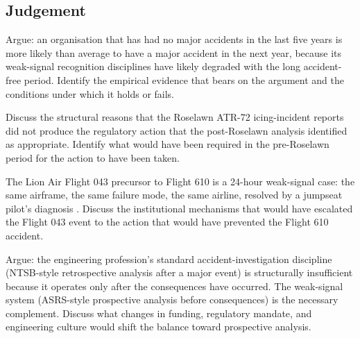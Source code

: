 \subsection*{Judgement}

\begin{exercise}
Argue: an organisation that has had no major accidents in the last five years is more likely than average to have a major accident in the next year, because its weak-signal recognition disciplines have likely degraded with the long accident-free period. Identify the empirical evidence that bears on the argument and the conditions under which it holds or fails.
\end{exercise}

\begin{exercise}
Discuss the structural reasons that the Roselawn ATR-72 icing-incident reports \cite{acc:ntsb-aar96-01} did not produce the regulatory action that the post-Roselawn analysis identified as appropriate. Identify what would have been required in the pre-Roselawn period for the action to have been taken.
\end{exercise}

\begin{exercise}
The Lion Air Flight 043 precursor to Flight 610 is a 24-hour weak-signal case: the same airframe, the same failure mode, the same airline, resolved by a jumpseat pilot's diagnosis \cite{acc:knkt-lion-air-610-2019,acc:house-737max-2020}. Discuss the institutional mechanisms that would have escalated the Flight 043 event to the action that would have prevented the Flight 610 accident.
\end{exercise}

\begin{exercise}
Argue: the engineering profession's standard accident-investigation discipline (NTSB-style retrospective analysis after a major event) is structurally insufficient because it operates only after the consequences have occurred. The weak-signal system (ASRS-style prospective analysis before consequences) is the necessary complement. Discuss what changes in funding, regulatory mandate, and engineering culture would shift the balance toward prospective analysis.
\end{exercise}
